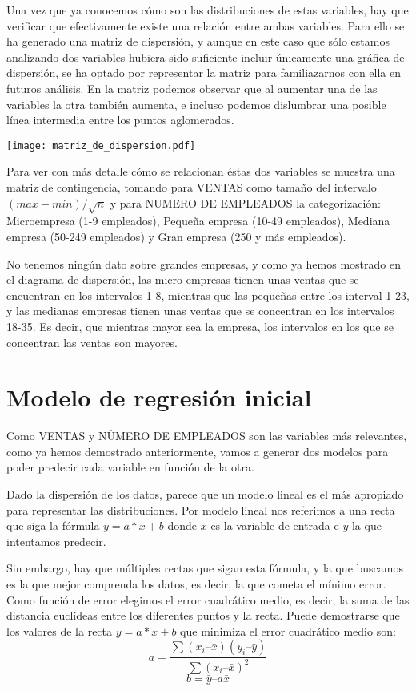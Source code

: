 \documentclass{article}
\begin{document}
Una vez que ya conocemos cómo son las distribuciones de estas variables, hay que verificar que efectivamente existe una relación entre ambas variables. Para ello se ha generado una matriz de dispersión, y aunque en este caso que sólo estamos analizando dos variables hubiera sido suficiente incluir únicamente una gráfica de dispersión, se ha optado por representar la matriz para familiazarnos con ella en futuros análisis. En la matriz podemos observar que al aumentar una de las variables la otra también aumenta, e incluso podemos dislumbrar una posible línea intermedia entre los puntos aglomerados.

\texttt{[image: matriz\_de\_dispersion.pdf]}
\FloatBarrier

Para ver con más detalle cómo se relacionan éstas dos variables se muestra una matriz de contingencia, tomando para VENTAS como tamaño del intervalo $(max - min)/\sqrt{n}$ y para NUMERO DE EMPLEADOS la categorización: Microempresa (1-9 empleados),
Pequeña empresa (10-49 empleados), Mediana empresa (50-249 empleados) y Gran empresa (250 y más empleados).

No tenemos ningún dato sobre grandes empresas, y como ya hemos mostrado en el diagrama de dispersión, las micro empresas tienen unas ventas que se encuentran en los intervalos 1-8, mientras que las pequeñas entre los interval 1-23, y las medianas empresas tienen unas ventas que se concentran en los intervalos 18-35. Es decir, que mientras mayor sea la empresa, los intervalos en los que se concentran las ventas son mayores.


\FloatBarrier

\section{Modelo de regresión inicial}

Como VENTAS y NÚMERO DE EMPLEADOS son las variables más relevantes, como ya hemos demostrado anteriormente, vamos a generar dos modelos para poder predecir cada variable en función de la otra.

Dado la dispersión de los datos, parece que un modelo lineal es el más apropiado para representar las distribuciones. Por modelo lineal nos referimos a una recta que siga la fórmula $y = a*x + b$ donde $x$ es la variable de entrada e $y$ la que intentamos predecir.

Sin embargo, hay que múltiples rectas que sigan esta fórmula, y la que buscamos es la que mejor comprenda los datos, es decir, la que cometa el mínimo error. Como función de error elegimos el error cuadrático medio, es decir, la suma de las distancia euclídeas entre los diferentes puntos y la recta. Puede demostrarse que los valores de la recta $y = a*x + b$ que minimiza el error cuadrático medio son:
\[a = \frac{\sum(x_i – \bar{x}) (y_i – \bar{y})} {\sum(x_i – \bar{x})^2}\]
\[b = \bar{y} – a \bar{x}\]
\end{document}
